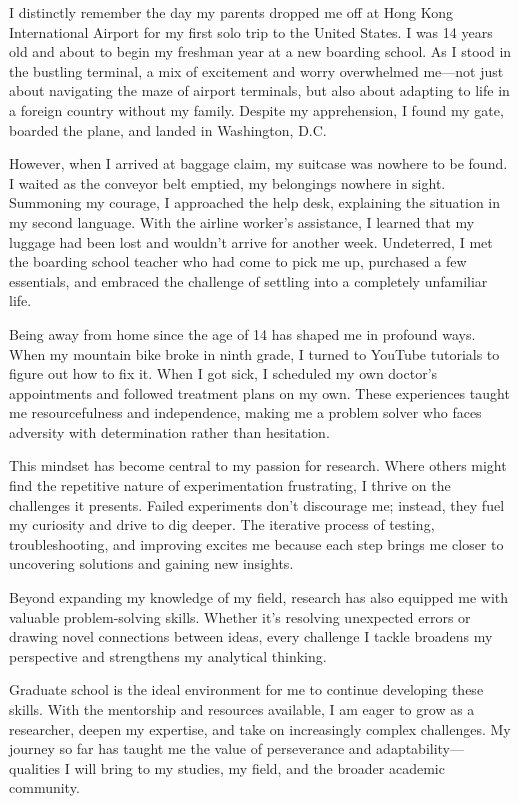 \documentclass[10pt]{article}
\newif\ifcomments
\newcommand{\todo}[1]{\ifcomments\textcolor{red}{TODO: #1}\fi}
\begin{document}
\todo{What about your individual background, perspective, or experience will serve as a source of strength for you or those around you at UVA? Feel free to write about any past experience or part of your background that has shaped your perspective and will be a source of strength, including but not limited to those related to your community, upbringing, educational environment, race, gender, or other aspects of your background that are important to you.}

I distinctly remember the day my parents dropped me off at Hong Kong International Airport for my first solo trip to the United States. I was 14 years old and about to begin my freshman year at a new boarding school. As I stood in the bustling terminal, a mix of excitement and worry overwhelmed me—not just about navigating the maze of airport terminals, but also about adapting to life in a foreign country without my family. Despite my apprehension, I found my gate, boarded the plane, and landed in Washington, D.C.

However, when I arrived at baggage claim, my suitcase was nowhere to be found. I waited as the conveyor belt emptied, my belongings nowhere in sight. Summoning my courage, I approached the help desk, explaining the situation in my second language. With the airline worker's assistance, I learned that my luggage had been lost and wouldn't arrive for another week. Undeterred, I met the boarding school teacher who had come to pick me up, purchased a few essentials, and embraced the challenge of settling into a completely unfamiliar life.

Being away from home since the age of 14 has shaped me in profound ways. When my mountain bike broke in ninth grade, I turned to YouTube tutorials to figure out how to fix it. When I got sick, I scheduled my own doctor's appointments and followed treatment plans on my own. These experiences taught me resourcefulness and independence, making me a problem solver who faces adversity with determination rather than hesitation.

This mindset has become central to my passion for research. Where others might find the repetitive nature of experimentation frustrating, I thrive on the challenges it presents. Failed experiments don't discourage me; instead, they fuel my curiosity and drive to dig deeper. The iterative process of testing, troubleshooting, and improving excites me because each step brings me closer to uncovering solutions and gaining new insights.

Beyond expanding my knowledge of my field, research has also equipped me with valuable problem-solving skills. Whether it's resolving unexpected errors or drawing novel connections between ideas, every challenge I tackle broadens my perspective and strengthens my analytical thinking.

Graduate school is the ideal environment for me to continue developing these skills. With the mentorship and resources available, I am eager to grow as a researcher, deepen my expertise, and take on increasingly complex challenges. My journey so far has taught me the value of perseverance and adaptability—qualities I will bring to my studies, my field, and the broader academic community.
\end{document}
